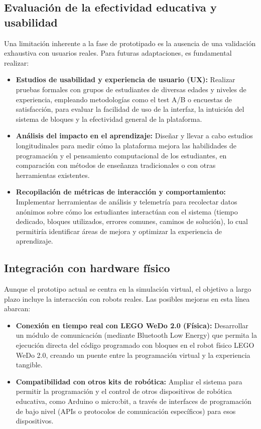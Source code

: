 \subsection{Evaluación de la efectividad educativa y usabilidad}
Una limitación inherente a la fase de prototipado es la ausencia de una validación exhaustiva con usuarios reales. Para futuras adaptaciones, es fundamental realizar:
\begin{itemize}
	\item \textbf{Estudios de usabilidad y experiencia de usuario (UX):} Realizar pruebas formales con grupos de estudiantes de diversas edades y niveles de experiencia, empleando metodologías como el test A/B o encuestas de satisfacción, para evaluar la facilidad de uso de la interfaz, la intuición del sistema de bloques y la efectividad general de la plataforma.
	\item \textbf{Análisis del impacto en el aprendizaje:} Diseñar y llevar a cabo estudios longitudinales para medir cómo la plataforma mejora las habilidades de programación y el pensamiento computacional de los estudiantes, en comparación con métodos de enseñanza tradicionales o con otras herramientas existentes.
	\item \textbf{Recopilación de métricas de interacción y comportamiento:} Implementar herramientas de análisis y telemetría para recolectar datos anónimos sobre cómo los estudiantes interactúan con el sistema (tiempo dedicado, bloques utilizados, errores comunes, caminos de solución), lo cual permitiría identificar áreas de mejora y optimizar la experiencia de aprendizaje.
\end{itemize}

\subsection{Integración con hardware físico}
Aunque el prototipo actual se centra en la simulación virtual, el objetivo a largo plazo incluye la interacción con robots reales. Las posibles mejoras en esta línea abarcan:
\begin{itemize}
	\item \textbf{Conexión en tiempo real con LEGO WeDo 2.0 (Física):} Desarrollar un módulo de comunicación (mediante Bluetooth Low Energy) que permita la ejecución directa del código programado con bloques en el robot físico LEGO WeDo 2.0, creando un puente entre la programación virtual y la experiencia tangible.
	\item \textbf{Compatibilidad con otros kits de robótica:} Ampliar el sistema para permitir la programación y el control de otros dispositivos de robótica educativa, como Arduino o micro:bit, a través de interfaces de programación de bajo nivel (APIs o protocolos de comunicación específicos) para esos dispositivos.
\end{itemize}


